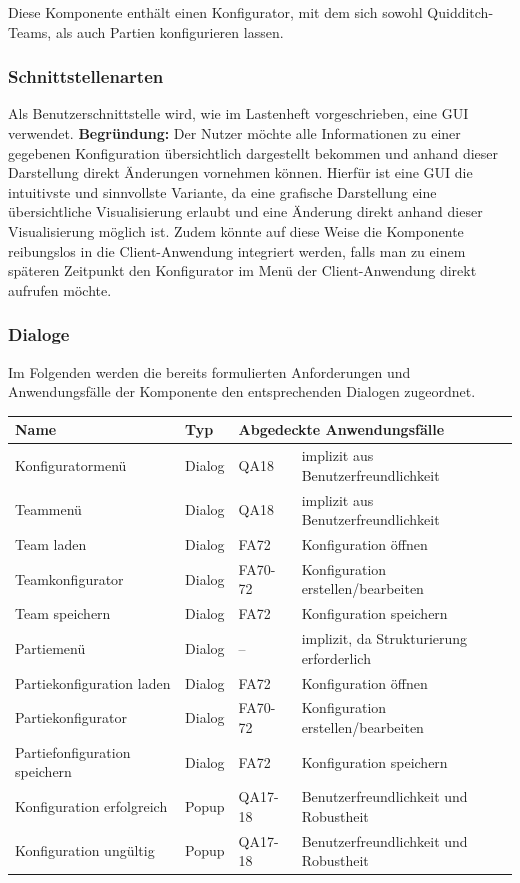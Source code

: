 \documentclass[a4paper,12pt,
headsepline,           %
oneside,               %
pointlessnumbers,      %
bibtotoc,              %
]{scrartcl}
\begin{document}
    Diese Komponente enthält einen Konfigurator, mit dem sich sowohl Quidditch-Teams, als auch Partien konfigurieren lassen.
	
	\subsubsection{Schnittstellenarten}
	
	Als Benutzerschnittstelle wird, wie im Lastenheft vorgeschrieben, eine GUI verwendet. \textbf{Begründung:} Der Nutzer möchte alle Informationen zu einer gegebenen Konfiguration übersichtlich dargestellt bekommen und anhand dieser Darstellung direkt Änderungen vornehmen können. Hierfür ist eine GUI die intuitivste und sinnvollste Variante, da eine grafische Darstellung eine übersichtliche Visualisierung erlaubt und eine Änderung direkt anhand dieser Visualisierung möglich ist. Zudem könnte auf diese Weise die Komponente reibungslos in die Client-Anwendung integriert werden, falls man zu einem späteren Zeitpunkt den Konfigurator im Menü der Client-Anwendung direkt aufrufen möchte.
	
	\subsubsection{Dialoge}
	
	Im Folgenden werden die bereits formulierten Anforderungen und Anwendungsfälle der Komponente den entsprechenden Dialogen zugeordnet.
	
	\begin{tabular}{| l l l l |}
	\hline
	\textbf{Name} & \textbf{Typ} & \multicolumn{2}{l|}{\textbf{Abgedeckte Anwendungsfälle}} \\\hline
	Konfiguratormenü & Dialog & QA18 & implizit aus Benutzerfreundlichkeit\\\hline
	Teammenü & Dialog & QA18 & implizit aus Benutzerfreundlichkeit\\\hline
	Team laden & Dialog & FA72 & Konfiguration öffnen \\\hline
	Teamkonfigurator & Dialog & FA70-72 & Konfiguration erstellen/bearbeiten\\\hline
	Team speichern & Dialog & FA72 & Konfiguration speichern \\\hline
	Partiemenü & Dialog & – & implizit, da Strukturierung erforderlich\\\hline
	Partiekonfiguration laden & Dialog & FA72 & Konfiguration öffnen \\\hline
	Partiekonfigurator & Dialog & FA70-72 & Konfiguration erstellen/bearbeiten\\\hline
	Partiefonfiguration speichern & Dialog & FA72 & Konfiguration speichern \\\hline
	Konfiguration erfolgreich & Popup & QA17-18 & Benutzerfreundlichkeit und Robustheit\\\hline
	Konfiguration ungültig & Popup & QA17-18 & Benutzerfreundlichkeit und Robustheit\\\hline
		
	\end{tabular}
	
\end{document}
